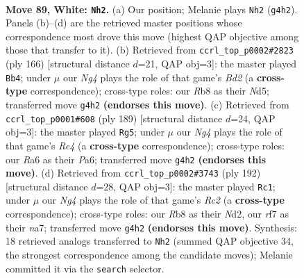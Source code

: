 \documentclass[11pt]{article}
\begin{document}
\clearpage

\begin{figure}[p]\centering
\begin{subfigure}{0.46\textwidth}\centering
\resizebox{\linewidth}{!}{%
\newchessgame
\chessboard[
  setfen={1R6/5rb1/R1P3k1/8/6NK/8/8/8 w - - 17 89},
  showmover=false,
  pgfstyle=straightmove, color=movearrow, markmove={g4-h2}
]}
\caption{}
\end{subfigure}\hfill
\begin{subfigure}{0.46\textwidth}\centering
\resizebox{\linewidth}{!}{%
\newchessgame
\chessboard[
  setfen={4r3/5k2/8/R2Nb3/8/3K4/3B4/8 w - - 34 84},
  showmover=false,
  pgfstyle=straightmove, color=movearrow, markmove={d2-b4}
]}
\caption{}
\end{subfigure}
\\[4pt]
\begin{subfigure}{0.46\textwidth}\centering
\resizebox{\linewidth}{!}{%
\newchessgame
\chessboard[
  setfen={8/8/p7/4r3/5R2/5B1k/5K2/8 b - - 19 95},
  showmover=false,
  pgfstyle=straightmove, color=movearrow, markmove={e5-g5}
]}
\caption{}
\end{subfigure}\hfill
\begin{subfigure}{0.46\textwidth}\centering
\resizebox{\linewidth}{!}{%
\newchessgame
\chessboard[
  setfen={8/n7/bk6/4K3/8/8/2RN4/8 w - - 55 97},
  showmover=false,
  pgfstyle=straightmove, color=movearrow, markmove={c2-c1}
]}
\caption{}
\end{subfigure}
\caption{\textbf{Move 89, White: \texttt{Nh2}.} (a) Our position; Melanie plays \texttt{Nh2} (\texttt{g4h2}). Panels (b)--(d) are the retrieved master positions whose correspondence most drove this move (highest QAP objective among those that transfer to it). (b) Retrieved from \texttt{ccrl\_top\_p0002\#2823} (ply 166) [structural distance $d$=21, QAP obj=3]: the master played \texttt{Bb4}; under $\mu$ our \emph{Ng4} plays the role of that game's \emph{Bd2} (a \textbf{cross-type} correspondence); cross-type roles: our \emph{R}b8 as their \emph{N}d5; transferred move \texttt{g4h2} \textbf{(endorses this move)}. (c) Retrieved from \texttt{ccrl\_top\_p0001\#608} (ply 189) [structural distance $d$=24, QAP obj=3]: the master played \texttt{Rg5}; under $\mu$ our \emph{Ng4} plays the role of that game's \emph{Re4} (a \textbf{cross-type} correspondence); cross-type roles: our \emph{R}a6 as their \emph{P}a6; transferred move \texttt{g4h2} \textbf{(endorses this move)}. (d) Retrieved from \texttt{ccrl\_top\_p0002\#3743} (ply 192) [structural distance $d$=28, QAP obj=3]: the master played \texttt{Rc1}; under $\mu$ our \emph{Ng4} plays the role of that game's \emph{Rc2} (a \textbf{cross-type} correspondence); cross-type roles: our \emph{R}b8 as their \emph{N}d2, our \emph{r}f7 as their \emph{n}a7; transferred move \texttt{g4h2} \textbf{(endorses this move)}. Synthesis: 18 retrieved analogs transferred to \texttt{Nh2} (summed QAP objective 34, the strongest correspondence among the candidate moves); Melanie committed it via the \texttt{search} selector.}
\label{fig:thought-m176}
\end{figure}
\end{document}
